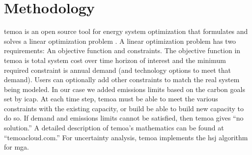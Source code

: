 \section{Methodology}
\gls{temoa} is an open source tool for energy system optimization that
formulates and solves a linear optimization problem
\cite{decarolis_tools_2020}. A linear optimization
problem has two requirements: An objective function and constraints. The
objective function in \gls{temoa} is total system cost over time horizon
of interest and the minimum required constraint is annual demand (and
technology options to meet that demand). Users can optionally add other
constraints to match the real system being modeled. In our case we added
emissions limits based on the carbon goals set by \gls{icap}. At each time step,
\gls{temoa} must be able to meet the various constraints with the existing
capacity, or build be able to build new capacity to do so. If demand and
emissions limits cannot be satisfied, then \gls{temoa} gives ``no solution.''
A detailed description of \gls{temoa}'s mathematics can be found at
``temoacloud.com.'' For uncertainty analysis, \gls{temoa} implements the \gls{hsj} algorithm for \gls{mga}.
